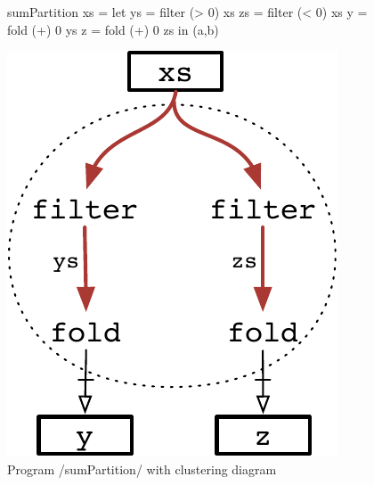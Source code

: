 \begin{figure}
\begin{minipage}{0.5\textwidth}
\begin{haskell}
sumPartition xs 
 = let ys = filter (> 0) xs
       zs = filter (< 0) xs
       y  = fold   (+) 0 ys
       z  = fold   (+) 0 zs
   in  (a,b)
\end{haskell}
\end{minipage}
\begin{minipage}{0.5\textwidth}
\begin{center}
\includegraphics[scale=0.7]{copy/03-body/clustering/figures/ex4-concestors.pdf}
\end{center}
\end{minipage}
\caption{Program \Hs/sumPartition/ with clustering diagram}
\label{clustering:f:concestors}
\end{figure}

